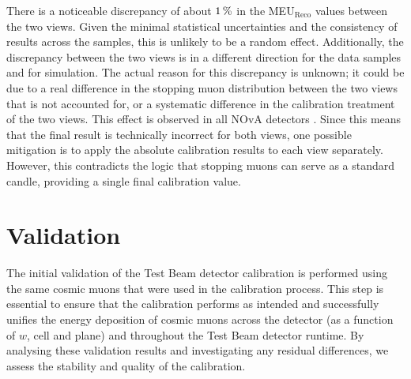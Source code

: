 
There is a noticeable discrepancy of about $\unit[1]{\%}$ in the \gls{MEU}$_{\mathrm{Reco}}$ values between the two views. Given the minimal statistical uncertainties and the consistency of results across the samples, this is unlikely to be a random effect. Additionally, the discrepancy between the two views is in a different direction for the data samples and for simulation. The actual reason for this discrepancy is unknown; it could be due to a real difference in the stopping muon distribution between the two views that is not accounted for, or a systematic difference in the calibration treatment of the two views. This effect is observed in all \gls{NOvA} detectors \cite{NOvA-doc-60709}. Since this means that the final result is technically incorrect for both views, one possible mitigation is to apply the absolute calibration results to each view separately. However, this contradicts the logic that stopping muons can serve as a standard candle, providing a single final calibration value.

\section{Validation}\label{sec:TBCalibValidation}

The initial validation of the Test Beam detector calibration is performed using the same cosmic muons that were used in the calibration process. This step is essential to ensure that the calibration performs as intended and successfully unifies the energy deposition of cosmic muons across the detector (as a function of $w$, cell and plane) and throughout the Test Beam detector runtime. By analysing these validation results and investigating any residual differences, we assess the stability and quality of the calibration.

